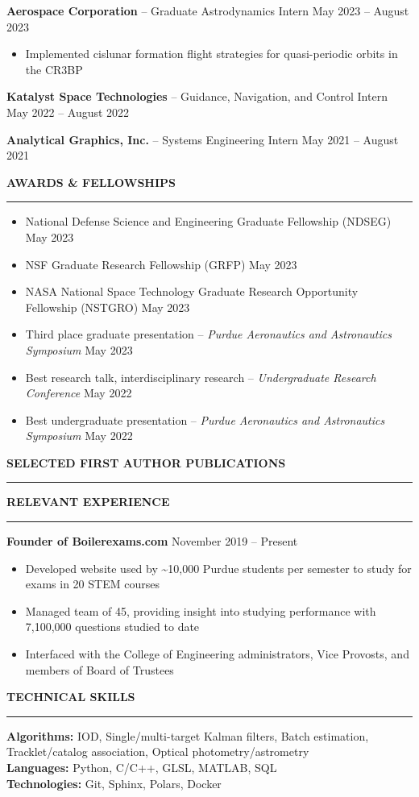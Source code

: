 \documentclass[10pt, a4paper]{article}
\newcommand{\sectiontitle}[1]{{\Large \textbf{#1}}\vspace{0.5em}\hrule\vspace{0.5em}}
\begin{document}
\textbf{Aerospace Corporation} -- Graduate Astrodynamics Intern \hfill May 2023 -- August 2023
\begin{itemize}[noitemsep]
    \item Implemented cislunar formation flight strategies for quasi-periodic orbits in the CR3BP
\end{itemize}

\textbf{Katalyst Space Technologies} -- Guidance, Navigation, and Control Intern \hfill May 2022 -- August 2022
\vspace{3px}

\textbf{Analytical Graphics, Inc.} -- Systems Engineering Intern \hfill May 2021 -- August 2021
\vspace{7px}

\sectiontitle{AWARDS \& FELLOWSHIPS}
\begin{itemize}[noitemsep]
    \item National Defense Science and Engineering Graduate Fellowship (NDSEG) \hfill May 2023
    \item NSF Graduate Research Fellowship (GRFP) \hfill May 2023
    \item NASA National Space Technology Graduate Research Opportunity Fellowship (NSTGRO) \hfill May 2023
    \item Third place graduate presentation -- \textit{Purdue Aeronautics and Astronautics Symposium} \hfill May 2023
    \item Best research talk, interdisciplinary research -- \textit{Undergraduate Research Conference} \hfill May 2022
    \item Best undergraduate presentation -- \textit{Purdue Aeronautics and Astronautics Symposium} \hfill May 2022
\end{itemize}

\sectiontitle{SELECTED FIRST AUTHOR PUBLICATIONS}
\nocite{*}
\printbibliography[heading=none, sorting=ynt]

\sectiontitle{RELEVANT EXPERIENCE}
\textbf{Founder of Boilerexams.com} \hfill November 2019 -- Present
\begin{itemize}[noitemsep]
    \item Developed website used by \textasciitilde10,000 Purdue students per semester to study for exams in 20 STEM courses
    \item Managed team of 45, providing insight into studying performance with 7,100,000 questions studied to date
    \item Interfaced with the College of Engineering administrators, Vice Provosts, and members of Board of Trustees
\end{itemize}

\sectiontitle{TECHNICAL SKILLS}
\textbf{Algorithms:} IOD, Single/multi-target Kalman filters, Batch estimation, Tracklet/catalog association, Optical photometry/astrometry \\
\textbf{Languages:} Python, C/C++, GLSL, MATLAB, SQL \\
\textbf{Technologies:} Git, Sphinx, Polars, Docker \\
\end{document}
